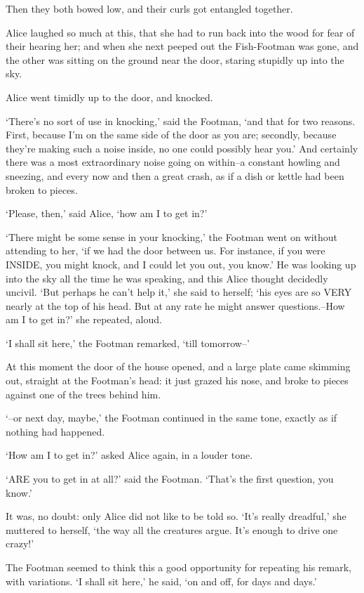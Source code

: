 \documentclass[12pt]{book}
\begin{document}
  Then they both bowed low, and their curls got entangled
together.

  Alice laughed so much at this, that she had to run back into
the wood for fear of their hearing her; and when she next peeped
out the Fish-Footman was gone, and the other was sitting on the
ground near the door, staring stupidly up into the sky.

  Alice went timidly up to the door, and knocked.

  `There's no sort of use in knocking,' said the Footman, `and
that for two reasons.  First, because I'm on the same side of the
door as you are; secondly, because they're making such a noise
inside, no one could possibly hear you.'  And certainly there was
a most extraordinary noise going on within--a constant howling
and sneezing, and every now and then a great crash, as if a dish
or kettle had been broken to pieces.

  `Please, then,' said Alice, `how am I to get in?'

  `There might be some sense in your knocking,' the Footman went
on without attending to her, `if we had the door between us.  For
instance, if you were INSIDE, you might knock, and I could let
you out, you know.'  He was looking up into the sky all the time
he was speaking, and this Alice thought decidedly uncivil.  `But
perhaps he can't help it,' she said to herself; `his eyes are so
VERY nearly at the top of his head.  But at any rate he might
answer questions.--How am I to get in?' she repeated, aloud.

  `I shall sit here,' the Footman remarked, `till tomorrow--'

  At this moment the door of the house opened, and a large plate
came skimming out, straight at the Footman's head:  it just
grazed his nose, and broke to pieces against one of the trees
behind him.

  `--or next day, maybe,' the Footman continued in the same tone,
exactly as if nothing had happened.

  `How am I to get in?' asked Alice again, in a louder tone.

  `ARE you to get in at all?' said the Footman.  `That's the
first question, you know.'

  It was, no doubt:  only Alice did not like to be told so.
`It's really dreadful,' she muttered to herself, `the way all the
creatures argue.  It's enough to drive one crazy!'

  The Footman seemed to think this a good opportunity for
repeating his remark, with variations.  `I shall sit here,' he
said, `on and off, for days and days.'
\end{document}
